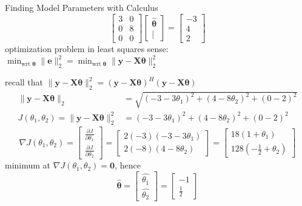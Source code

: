 \documentclass[mathserif, aspectratio=1610]{intbeamer}
\begin{document}
\begin{frame}[t]{Finding Model Parameters with Calculus}
%
$$
\begin{bmatrix}
3 & 0 \\ 0 & 8 \\ 0 & 0
\end{bmatrix}
\begin{bmatrix}
\hat{\bm{\theta}} \\ |
\end{bmatrix}=
\begin{bmatrix}
-3 \\ 4 \\ 2
\end{bmatrix}
$$
%
optimization problem in least squares sense: $\min_{\text{wrt }\bm{\theta}} \lVert\bm{e}\rVert_2^2 = \min_{\text{wrt }\bm{\theta}} \lVert\bm{y} - \bm{X} \bm{\theta}\rVert_2^2$
%

recall that $\lVert\bm{y} - \bm{X} \bm{\theta}\rVert_2^2 = (\bm{y} - \bm{X} \bm{\theta})^H (\bm{y} - \bm{X} \bm{\theta})$
\begin{align*}
\lVert \bm{y} - \bm{X} \bm{\theta}\rVert_2  &= \sqrt{(-3 - 3\theta_1)^2 + (4-8\theta_2)^2 + (0-2)^2}\\
J(\theta_1, \theta_2) = \lVert\bm{y} - \bm{X} \bm{\theta}\rVert_2^2 &= (-3 - 3\theta_1)^2 + (4-8\theta_2)^2 + (0-2)^2
\end{align*}
%
$$
\nabla J(\theta_1, \theta_2) =
\begin{bmatrix}
\frac{\partial J}{\partial \theta_1}\\
\frac{\partial J}{\partial \theta_2}
\end{bmatrix}
=
\begin{bmatrix}
2 (-3) (-3 - 3\theta_1)
\\
2 (-8) (4-8\theta_2)
\end{bmatrix}
=
\begin{bmatrix}
18 (1 + \theta_1)
\\
128 (-\frac{1}{2}+\theta_2)
\end{bmatrix}
$$
%
minimum at $\nabla J(\theta_1, \theta_2) = \bm{0}$, hence
%
$$
\hat{\bm{\theta}}
=
\begin{bmatrix}
\hat{\theta_1}
\\
\hat{\theta_2}
\end{bmatrix}
=
\begin{bmatrix}
-1
\\
\frac{1}{2}
\end{bmatrix}
$$


\end{frame}
\end{document}
